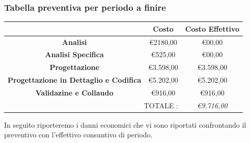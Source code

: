 \documentclass[12pt,a4paper,titlepage]{article}
\begin{document}
	\subsubsection{Tabella preventiva per periodo a finire}
	\begin{center}
	{\renewcommand\arraystretch{1.2} %
		\begin{tabular}{|c|c|c|}
			\hline 
			& \textbf{Costo} & \textbf{Costo Effettivo} \\ 
			\hline 
			\textbf{Analisi} & \euro 2180,00 & \euro 00,00 \\ 
			\hline 
			\textbf{Analisi Specifica} & \euro 525,00 & \euro 00,00 \\ 
			\hline 
			\textbf{Progettazione} & \euro 3.598,00 & \euro 3.598,00 \\ 
			\hline 
			\textbf{Progettazione in Dettaglio e Codifica} & \euro 5.202,00 & \euro 5.202,00 \\ 
			\hline 
			\textbf{Validazine e Collaudo} & \euro 916,00 & \euro 916,00 \\ 
			\hline 
			\multicolumn{2}{r|}{TOTALE :} & \textit{\euro 9.716,00 } \\ 
		\end{tabular}
	} 
	\vspace{0.5cm}
	\end{center}
	
	In seguito riporteremo i danni economici che vi sono riportati confrontando il preventivo con l'effettivo consuntivo di periodo.
	
\end{document}
